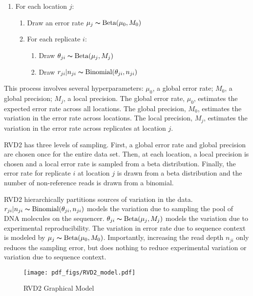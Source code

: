 \documentclass[11pt,reqno]{amsart}
\begin{document}
\begin{enumerate}[noitemsep]
	\item For each location $j$: 
	\begin{enumerate}
		\item Draw an error rate $\mu_j \thicksim \text{Beta}(\mu_0, M_0)$
		\item For each replicate $i$:
		\begin{enumerate}
			\item Draw $\theta_{ji} \thicksim \text{Beta}(\mu_j, M_j)$
			\item Draw $r_{ji} | n_{ji} \thicksim \text{Binomial}(\theta_{ji}, n_{ji})$
		\end{enumerate}
	\end{enumerate}
\end{enumerate}

This process involves several hyperparameters: $\mu_0$, a global error rate; $M_0$, a global precision; $M_j$, a local precision. The global error rate, $\mu_0$, estimates the expected error rate across all locations. The global precision, $M_0$, estimates the variation in the error rate  across locations. The local precision, $M_j$, estimates the variation in the error rate across replicates at location $j$.

RVD2 has three levels of sampling. First, a global error rate and global precision are chosen once for the entire data set. Then, at each location, a local precision is chosen and a local error rate is sampled from a beta distribution. Finally, the error rate for replicate $i$ at location $j$ is drawn from a beta distribution and the number of non-reference reads is drawn from a binomial.

RVD2 hierarchically partitions sources of variation in the data. $r_{ji} | n_{ji} \thicksim \text{Binomial}(\theta_{ji}, n_{ji})$ models the variation due to sampling the pool of DNA molecules on the sequencer. $\theta_{ji} \thicksim \text{Beta}(\mu_j, M_j)$ models the variation due to experimental reproducibility. The variation in error rate due to sequence context is modeled by $\mu_j \thicksim \text{Beta}(\mu_0, M_0)$. Importantly, increasing the read depth $n_{ji}$ only reduces the sampling error, but does nothing to reduce experimental variation or variation due to sequence context.

\begin{figure}[h]
\begin{center}
\texttt{[image: pdf\_figs/RVD2\_model.pdf]}
\caption{RVD2 Graphical Model}
\label{fig:graphical_model}
\end{center}
\end{figure}
\end{document}

